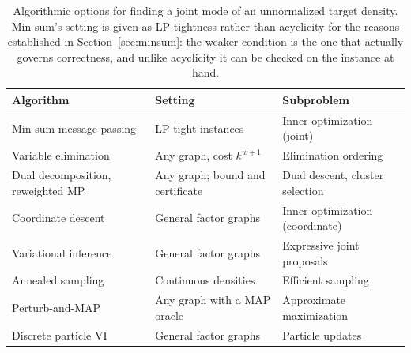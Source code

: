 \begin{table}[h]
    \centering
    \small
    \begin{tabular}{@{}p{4.3cm}p{4.2cm}p{4.4cm}@{}}
        \toprule
        \textbf{Algorithm} & \textbf{Setting} & \textbf{Subproblem} \\
        \midrule
        Min-sum message passing & LP-tight instances & Inner optimization (joint) \\
        Variable elimination & Any graph, cost $k^{w+1}$ & Elimination ordering \\
        Dual decomposition, reweighted MP & Any graph; bound and certificate & Dual descent, cluster selection \\
        Coordinate descent & General factor graphs & Inner optimization (coordinate) \\
        Variational inference & General factor graphs & Expressive joint proposals \\
        Annealed sampling & Continuous densities & Efficient sampling \\
        Perturb-and-MAP & Any graph with a MAP oracle & Approximate maximization \\
        Discrete particle VI & General factor graphs & Particle updates \\
        \bottomrule
    \end{tabular}
    \caption{Algorithmic options for finding a joint mode of an unnormalized target density. Min-sum's setting is given as LP-tightness rather than acyclicity for the reasons established in Section~\ref{sec:minsum}: the weaker condition is the one that actually governs correctness, and unlike acyclicity it can be checked on the instance at hand.}
    \label{tab:existing_algorithms}
\end{table}

